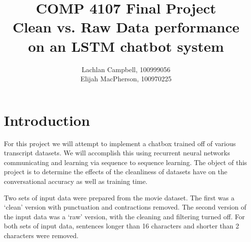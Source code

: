 \documentclass[titlepage]{article}
\newcommand\tab[1][1cm]{\hspace*{#1}}
\begin{document}
\title{COMP 4107 Final Project\\
         {\small Clean vs. Raw Data performance on an LSTM chatbot system}}
\author{Lachlan Campbell, 100999056\\
              Elijah MacPherson, 100970225}
\maketitle

\section{Introduction}
\tab For this project we will attempt to implement a chatbox trained off of various transcript datasets. We will accomplish this using recurrent neural networks communicating and learning via sequence to sequence learning. The object of this project is to determine the effects of the cleanliness of datasets have on the conversational accuracy as well as training time.

Two sets of input data were prepared from the movie dataset. The first was a `clean' version with punctuation and contractions removed. The second version of the input data was a `raw' version, with the cleaning and filtering turned off. For both sets of input data, sentences longer than 16 characters and shorter than 2 characters were removed.
\end{document}
